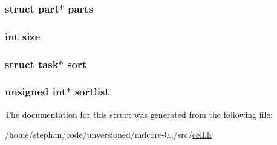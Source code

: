 \hypertarget{structcell_a9de7180e861590a7c5ff24ae3eab56ed}{
\subsubsection[{parts}]{\setlength{\rightskip}{0pt plus 5cm}struct {\bf part}$\ast$ parts}}\label{structcell_a9de7180e861590a7c5ff24ae3eab56ed}
\hypertarget{structcell_a439227feff9d7f55384e8780cfc2eb82}{
\subsubsection[{size}]{\setlength{\rightskip}{0pt plus 5cm}int size}}\label{structcell_a439227feff9d7f55384e8780cfc2eb82}
\hypertarget{structcell_aa5f1733249f610dbecb00b23369c2008}{
\subsubsection[{sort}]{\setlength{\rightskip}{0pt plus 5cm}struct {\bf task}$\ast$ sort}}\label{structcell_aa5f1733249f610dbecb00b23369c2008}
\hypertarget{structcell_a4151bd113572f23f471e24240cad4e65}{
\subsubsection[{sortlist}]{\setlength{\rightskip}{0pt plus 5cm}unsigned int$\ast$ sortlist}}\label{structcell_a4151bd113572f23f471e24240cad4e65}


The documentation for this struct was generated from the following file\-:\begin{DoxyCompactItemize}
\item 
/home/stephan/code/unversioned/mdcore-\/0../src/\hyperlink{cell_8h}{cell.\-h}\end{DoxyCompactItemize}
